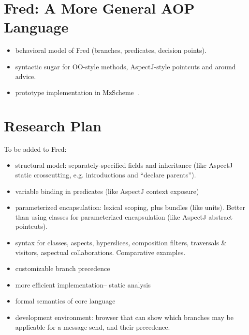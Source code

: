 \documentclass{article}
\begin{document}
\section{Fred: A More General AOP Language}
\label{Fred}

\begin{itemize}
\item behavioral model of Fred (branches, predicates, decision points).
\item syntactic sugar for OO-style methods, AspectJ-style pointcuts and around advice.
\item prototype implementation in MzScheme~\cite{MzScheme}.
\end{itemize}

\section{Research Plan}
\label{research}

To be added to Fred:

\begin{itemize}
\item structural model: separately-specified fields and inheritance
      (like AspectJ static crosscutting, e.g. introductions and
      ``declare parents'').
\item variable binding in predicates (like AspectJ context exposure)
\item parameterized encapsulation: lexical scoping, plus bundles (like
      units).  Better than using classes for parameterized
      encapsulation (like AspectJ abstract pointcuts).
\item syntax for classes, aspects, hyperslices, composition filters,
      traversals \& visitors, aspectual collaborations.  Comparative
      examples.
\item customizable branch precedence
\item more efficient implementation-- static analysis
\item formal semantics of core language
\item development environment: browser that can show which branches
      may be applicable for a message send, and their precedence.
\end{itemize}

\newcommand{\htmladdnormallink}[2]{#1}



\end{document}
